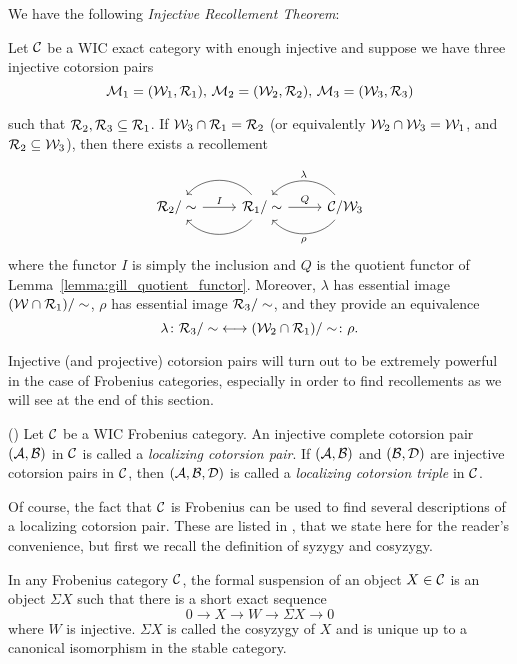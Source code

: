 We have the following \emph{Injective Recollement Theorem}:

\begin{thm}{\cite[Theorem~3.4]{G7}}\label{thm:gil_inj_recoll}
  Let $\mathcal{C}$ be a WIC exact category with enough injective and suppose we have three injective cotorsion pairs
  \[
    \mathcal{M}_1=(\mathcal{W}_1,\mathcal{R}_1)\text{, }\mathcal{M}_2=(\mathcal{W}_2,\mathcal{R}_2)\text{, }\mathcal{M}_3=(\mathcal{W}_3,\mathcal{R}_3)
  \]
  \begin{sloppypar}
  such that $\mathcal{R}_2,\mathcal{R}_3\subseteq \mathcal{R}_1$. If $\mathcal{W}_3\cap\mathcal{R}_1=\mathcal{R}_2$ (or equivalently ${\mathcal{W}_2\cap\mathcal{W}_3=\mathcal{W}_1}$, and $\mathcal{R}_2\subseteq \mathcal{W}_3$), then there exists a recollement
  \end{sloppypar}
  \begin{equation*}
    \begin{tikzcd}
      {\R_2/\sim}\arrow{r}{I}
      & {\R_1/\sim}\arrow[bend left=50]{l}\arrow[bend right=50]{l}\arrow{r}{Q}
      & \C/\W_3\arrow[bend left=50]{l}{\rho}\arrow[bend right=50]{l}[']{\lambda}
    \end{tikzcd}
  \end{equation*}
  where the functor $I$ is simply the inclusion and $Q$ is the quotient functor of Lemma~\ref{lemma:gill_quotient_functor}. Moreover, $\lambda$ has essential image $(\mathcal{W}\cap\mathcal{R}_1)/\sim$, $\rho$ has essential image ${\mathcal{R}_3/\sim}$, and they provide an equivalence \[\lambda\colon{\mathcal{R}_3/\sim} \longleftrightarrow (\mathcal{W}_2\cap\mathcal{R}_1)/\sim\colon\rho.\]
\end{thm}

Injective (and projective) cotorsion pairs will turn out to be extremely powerful in the case of Frobenius categories, especially in order to find recollements as we will see at the end of this section.

\begin{defn} (\cite[Definition 4.3]{G7}) Let $\mathcal{C}$ be a WIC Frobenius category.
An injective complete cotorsion pair $(\mathcal{A}, \mathcal{B})$ in $\mathcal{C}$ is called a \emph{localizing cotorsion pair}. If $(\mathcal{A}, \mathcal{B})$ and $(\mathcal{B}, \mathcal{D})$ are injective cotorsion pairs in $\mathcal{C}$, then $(\mathcal{A}, \mathcal{B}, \mathcal{D})$ is called a \emph{localizing cotorsion triple} in $\mathcal{C}$.
\end{defn}

Of course, the fact that $\mathcal{C}$ is Frobenius can be used to find several descriptions of a localizing cotorsion pair. These are listed in \cite[Proposition 4.2]{G7}, that we state here for the reader's convenience, but first we recall the definition of syzygy and cosyzygy.

\begin{defn}
  In any Frobenius category $\mathcal{C}$, the formal suspension of an object $X\in\mathcal{C}$ is an object $\Sigma X$ such that there is a short exact sequence
  \[ 0\to X\to W\to \Sigma X\to 0 \]
  where $W$ is injective. $\Sigma X$ is called the cosyzygy of $X$ and is unique up to a canonical isomorphism in the stable category.
\end{defn}

